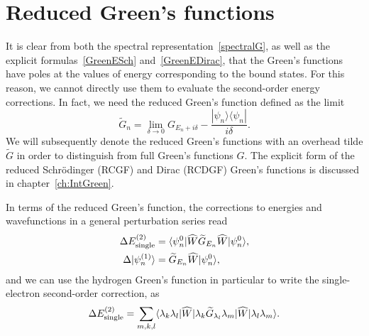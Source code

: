 \section{Reduced Green's functions}

It is clear from both the spectral representation~\eqref{spectralG}, as well as the explicit formulas~\eqref{GreenESch} and~\eqref{GreenEDirac}, that the Green's functions have poles at the values of energy corresponding to the bound states. For this reason, we cannot directly use them to evaluate the second-order energy corrections. In fact, we need the reduced Green's function defined as the limit
\begin{equation} \label{Glimit}
	\widetilde G_n = \lim_{\delta \rightarrow 0} G_{E_n+i \delta} - \frac{|\psi_n \rangle \langle \psi_n|}{i \delta}.
\end{equation}
We will subsequently denote the reduced Green's functions with an overhead tilde $\widetilde{G}$ in order to distinguish from full Green's functions $G$. The explicit form of the reduced Schr\"odinger (RCGF) and Dirac (RCDGF) Green's functions is discussed in chapter~\ref{ch:IntGreen}.

In terms of the reduced Green's function, the corrections to energies and wavefunctions in a general perturbation series read
\begin{align}
	\Delta E^{(2)}_{\rm{single}} &= \langle \psi^0_n|\widehat{W}\widetilde G_{E_n} \widehat{W}|\psi^0_n\rangle,
	\\
	\Delta|\psi_n^{(1)}\rangle &= \widetilde G_{E_n} \widehat{W}|\psi^0_n\rangle,
\end{align}
and we can use the hydrogen Green's function in particular to write the single-electron second-order correction, as
\begin{equation} \label{SecondSingle}
    \Delta E^{(2)}_{\rm{single}} = \sum_{m,k,l} \langle \lambda_k \lambda_l|\widehat{W} |\lambda_k \widetilde{G}_{\lambda_l} \lambda_m|\widehat{W}|\lambda_l \lambda_m \rangle.
\end{equation}

